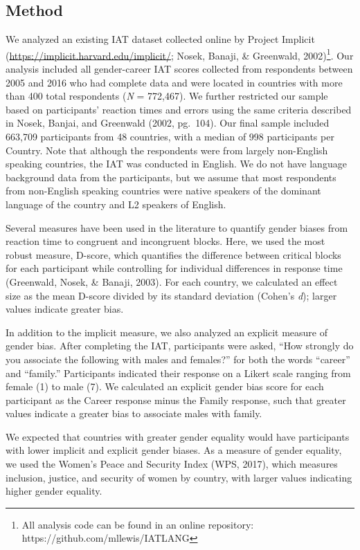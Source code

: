 \documentclass[10pt, letterpaper]{article}
\begin{document}
\subsection{Method}\label{method}

We analyzed an existing IAT dataset collected online by Project Implicit
(\url{https://implicit.harvard.edu/implicit/}; Nosek, Banaji, \&
Greenwald,
2002)\footnote{All analysis code can be found in an online repository: https://github.com/mllewis/IATLANG}.
Our analysis included all gender-career IAT scores collected from
respondents between 2005 and 2016 who had complete data and were located
in countries with more than 400 total respondents (\emph{N} = 772,467).
We further restricted our sample based on participants' reaction times
and errors using the same criteria described in Nosek, Banjai, and
Greenwald (2002, pg.~104). Our final sample included 663,709
participants from 48 countries, with a median of 998 participants per
Country. Note that although the respondents were from largely
non-English speaking countries, the IAT was conducted in English. We do
not have language background data from the participants, but we assume
that most respondents from non-English speaking countries were native
speakers of the dominant language of the country and L2 speakers of
English.

Several measures have been used in the literature to quantify gender
biases from reaction time to congruent and incongruent blocks. Here, we
used the most robust measure, D-score, which quantifies the difference
between critical blocks for each participant while controlling for
individual differences in response time (Greenwald, Nosek, \& Banaji,
2003). For each country, we calculated an effect size as the mean
D-score divided by its standard deviation (Cohen's \emph{d}); larger
values indicate greater bias.

In addition to the implicit measure, we also analyzed an explicit
measure of gender bias. After completing the IAT, participants were
asked, ``How strongly do you associate the following with males and
females?'' for both the words ``career'' and ``family.'' Participants
indicated their response on a Likert scale ranging from female (1) to
male (7). We calculated an explicit gender bias score for each
participant as the Career response minus the Family response, such that
greater values indicate a greater bias to associate males with family.

We expected that countries with greater gender equality would have
participants with lower implicit and explicit gender biases. As a
measure of gender equality, we used the Women's Peace and Security Index
(WPS, 2017), which measures inclusion, justice, and security of women by
country, with larger values indicating higher gender equality.
\end{document}
